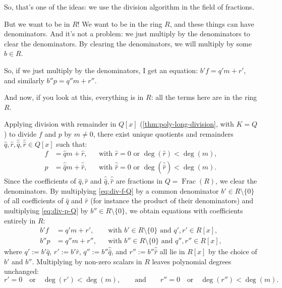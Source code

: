 \begin{proofWrapper}
\begin{speech}[00:39:16 - 00:41:26]
So, that's one of the ideas: we use the division algorithm in the field of fractions.

But we want to be in $R$! We want to be in the ring $R$, and these things can have denominators. And it's not a problem: we just multiply by the denominators to clear the denominators. By clearing the denominators, we will multiply by some $b \in R$. 

So, if we just multiply by the denominators, I get an equation: $b' f = q' m + r'$,  and similarly $b'' p = q'' m + r''$. 

And now, if you look at this, everything is in $R$: all the terms here are in the ring $R$. 
\end{speech}

\begin{content}
Applying division with remainder in $Q[x]$ (\cref{thm:poly-long-division}, with $K = Q$) to divide $f$ and $p$ by $m \neq 0$, there exist unique quotients and remainders $\hat{q}, \hat{r}, \hat{\hat{q}}, \hat{\hat{r}} \in Q[x]$ such that:
\begin{align}
f &= \hat{q} m + \hat{r}, && \text{with } \hat{r} = 0 \text{ or } \deg(\hat{r}) < \deg(m), \label{eq:div-f-Q} \\
p &= \hat{\hat{q}} m + \hat{\hat{r}}, && \text{with } \hat{\hat{r}} = 0 \text{ or } \deg(\hat{\hat{r}}) < \deg(m). \label{eq:div-p-Q}
\end{align}
Since the coefficients of $\hat{q}, \hat{r}$ and $\hat{\hat{q}}, \hat{\hat{r}}$ are fractions in $Q = \operatorname{Frac}(R)$, we clear the denominators. By multiplying \eqref{eq:div-f-Q} by a common denominator $b' \in R \setminus \{0\}$ of all coefficients of $\hat{q}$ and $\hat{r}$ (for instance the product of their denominators) and multiplying \eqref{eq:div-p-Q} by $b'' \in R \setminus \{0\}$, we obtain equations with coefficients entirely in $R$:
\begin{align}
b' f &= q' m + r', && \text{with } b' \in R \setminus \{0\} \text{ and } q', r' \in R[x], \label{eq:cleared-f-div} \\
b'' p &= q'' m + r'', && \text{with } b'' \in R \setminus \{0\} \text{ and } q'', r'' \in R[x], \label{eq:cleared-p-div}
\end{align}
where $q' := b' \hat{q}$, $r' := b' \hat{r}$, $q'' := b'' \hat{\hat{q}}$, and $r'' := b'' \hat{\hat{r}}$ all lie in $R[x]$ by the choice of $b'$ and $b''$.
Multiplying by non-zero scalars in $R$ leaves polynomial degrees unchanged:
\[
r' = 0 \quad \text{or} \quad \deg(r') < \deg(m), \qquad \text{and} \qquad r'' = 0 \quad \text{or} \quad \deg(r'') < \deg(m).
\]
\end{content}


\end{proofWrapper}
